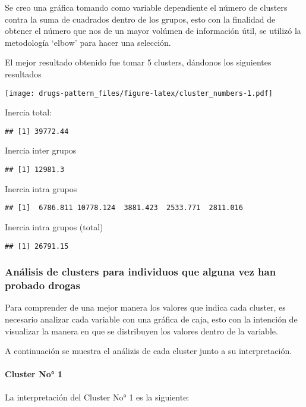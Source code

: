 \documentclass[]{article}
\let\oldparagraph\paragraph
\renewcommand{\paragraph}[1]{\oldparagraph{#1}\mbox{}}
\begin{document}
Se creo una gráfica tomando como variable dependiente el número de
clusters contra la suma de cuadrados dentro de los grupos, esto con la
finalidad de obtener el número que nos de un mayor volúmen de
información útil, se utilizó la metodología `elbow' para hacer una
selección.

El mejor resultado obtenido fue tomar 5 clusters, dándonos los
siguientes resultados

\texttt{[image: drugs-pattern\_files/figure-latex/cluster\_numbers-1.pdf]}

Inercia total:

\begin{verbatim}
## [1] 39772.44
\end{verbatim}

Inercia inter grupos

\begin{verbatim}
## [1] 12981.3
\end{verbatim}

Inercia intra grupos

\begin{verbatim}
## [1]  6786.811 10778.124  3881.423  2533.771  2811.016
\end{verbatim}

Inercia intra grupos (total)

\begin{verbatim}
## [1] 26791.15
\end{verbatim}

\subsubsection{Análisis de clusters para individuos que alguna vez han
probado
drogas}\label{analisis-de-clusters-para-individuos-que-alguna-vez-han-probado-drogas}

Para comprender de una mejor manera los valores que indica cada cluster,
es necesario analizar cada variable con una gráfica de caja, esto con la
intención de visualizar la manera en que se distribuyen los valores
dentro de la variable.

A continuación se muestra el análizis de cada cluster junto a su
interpretación.

\paragraph{Cluster No° 1}\label{cluster-no-1}

La interpretación del Cluster No° 1 es la siguiente:
\end{document}
